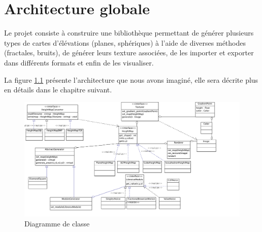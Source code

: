 \chapter{Architecture globale}

Le projet consiste à construire une bibliothèque permettant de générer plusieurs
types de cartes d'élévations (planes, sphériques) à l'aide de diverses
méthodes (fractales, bruits), de générer leurs texture associées, de les
importer et exporter dans différents formats et enfin de les visualiser.

La figure \ref{fig:class-diagram} présente l'architecture que nous avons imaginé,
elle sera décrite plus en détails dans le chapitre suivant.

\begin{figure}
  \includegraphics[width=28cm]{resources/class-diagram.png}
        \caption{Diagramme de classe}
        \label{fig:class-diagram}
\end{figure}
